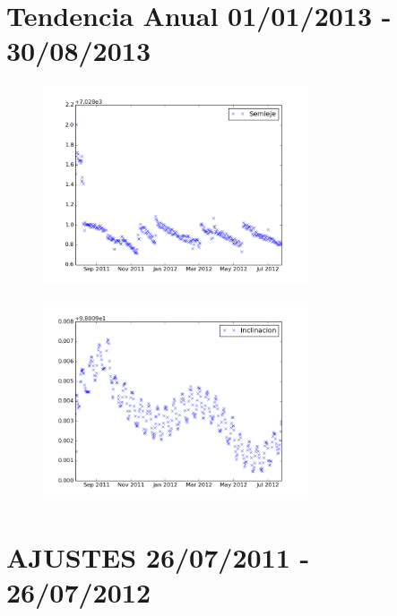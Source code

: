 \section*{Tendencia Anual 01/01/2013 - 30/08/2013}
\begin{figure}[!h]
\centering
  \includegraphics[width=0.7\textwidth]{imagenes/sacDtendSemi}
\end{figure}
\begin{figure}[!h]
\centering
  \includegraphics[width=0.7\textwidth]{imagenes/sacDtendInc}
\end{figure}


\section*{AJUSTES 26/07/2011 - 26/07/2012}
